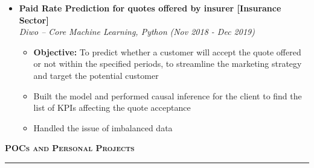 \documentclass[a4paper,10pt]{article}
\newcommand{\isep}{-2 pt}
\newcommand{\lsep}{-0.5cm}
\newcommand{\resheading}[1]{{\small
        {
            \begin{minipage}
                {0.992\textwidth}\textbf{{\textsc{#1 \vphantom{p\^{E}} }}}
                \\[-0.3cm]
                \hrule
            \end{minipage}
            \\[-0.5cm]
        }
 }}
\begin{document}
\begin{itemize}
\item \textbf{Paid Rate Prediction for quotes offered by insurer [Insurance Sector]}  \\
    \emph{Diwo -- Core Machine Learning, Python} \hfill {\emph{(Nov 2018 - Dec 2019)}}
    \\[-0.5cm]
    \begin{itemize}\itemsep \isep
    	\item \textbf{Objective:} To predict whether a customer will accept the quote offered or not within the specified periods, to streamline the marketing strategy and target the potential customer 
        \item Built the model and performed causal inference for the client to find the list of KPIs affecting the quote acceptance 
        \item Handled the issue of imbalanced data
        \\ [-0.5cm]
    \end{itemize}

\end{itemize}
\resheading{\textbf{\large POCs and Personal Projects}}\\[\lsep]
\\[-0.3cm]
\end{document}
